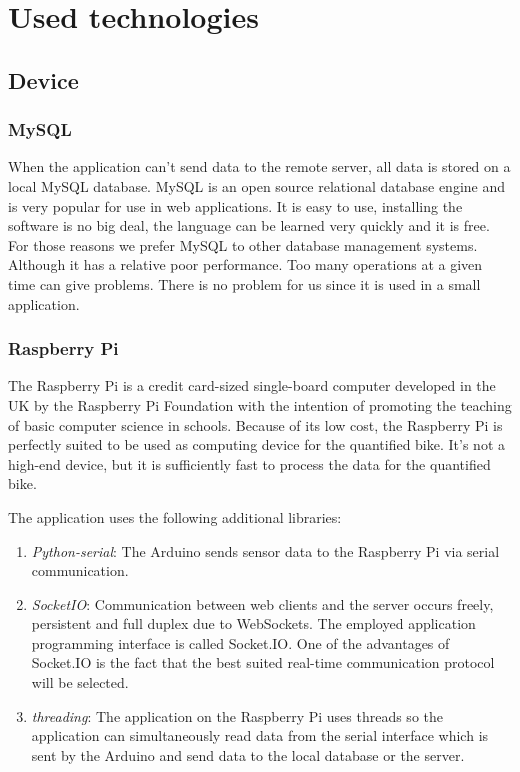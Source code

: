 \section{Used technologies}
\subsection{Device}
\subsubsection{MySQL}
When the application can't send data to the remote server, all data is stored on a local MySQL database. MySQL is an open source relational database engine and is very popular for use in web applications. It is easy to use, installing the software is no big deal, the language can be learned very quickly and it is free. For those reasons we prefer MySQL to other database management systems. Although it has a relative poor performance. Too many operations at a given time can give problems. There is no problem for us since it is used in a small application.
\subsubsection{Raspberry Pi}
The Raspberry Pi is a credit card-sized single-board computer developed in the UK by the Raspberry Pi Foundation with the intention of promoting the teaching of basic computer science in schools.\cite{RaspberryWikipedia}
Because of its low cost, the Raspberry Pi is perfectly suited to be used as computing device for the quantified bike. 
It's not a high-end device, but it is sufficiently fast to process the data for the quantified bike.

The application uses the following additional libraries:
\begin{enumerate}
 \item \textit{Python-serial}: The Arduino sends sensor data to the Raspberry Pi via serial communication.
 \item \textit{SocketIO}: Communication between web clients and the server occurs freely, persistent and full duplex due to WebSockets. The employed application programming interface is called Socket.IO. One of the advantages of Socket.IO is the fact that the best suited real-time communication protocol will be selected.
 \item \textit{threading}: The application on the Raspberry Pi uses threads so the application can simultaneously read data from the serial interface which is sent by the Arduino and send data to the local database or the server.
\end{enumerate}

